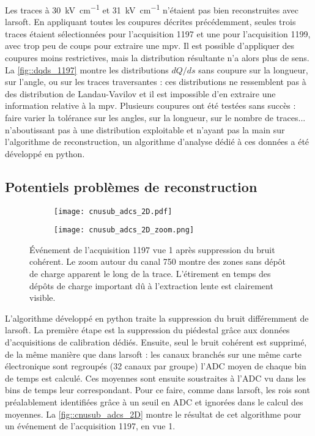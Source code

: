     Les traces à \SI{30}{\kilo\volt\per\centi\meter} et \SI{31}{\kilo\volt\per\centi\meter} n'étaient pas bien reconstruites avec \gls{larsoft}. En appliquant toutes les coupures décrites précédemment, seules trois traces étaient sélectionnées pour l'acquisition 1197 et une pour l'acquisition 1199, avec trop peu de coups pour extraire une \gls{mpv}. Il est possible d'appliquer des coupures moins restrictives, mais la distribution résultante n'a alors plus de sens. La \autoref{fig::dqds_1197} montre les distributions $dQ/ds$ sans coupure sur la longueur, sur l'angle, ou sur les traces traversantes : ces distributions ne ressemblent pas à des distribution de Landau-Vavilov et il est impossible d'en extraire une information relative à la \gls{mpv}. Plusieurs coupures ont été testées sans succès : faire varier la tolérance sur les angles, sur la longueur, sur le nombre de traces... n'aboutissant pas à une distribution exploitable et n'ayant pas la main sur l'algorithme de reconstruction, un algorithme d'analyse dédié à ces données a été développé en python.

    \subsection{Potentiels problèmes de reconstruction}

      \begin{figure}[htbp]
        \centering
        \begin{subfigure}[t]{0.8\textwidth}
          \centering
          \texttt{[image: cnusub\_adcs\_2D.pdf]}
        \end{subfigure}\hfill
        \begin{subfigure}[t]{0.19\textwidth}
          \centering
          \texttt{[image: cnusub\_adcs\_2D\_zoom.png]}
        \end{subfigure}
        \caption[Événement de l'acquisition 1197 vue 1 après suppression du bruit cohérent]{\label{fig::cnusub_adcs_2D}Événement de l'acquisition 1197 vue 1 après suppression du bruit cohérent. Le zoom autour du canal 750 montre des zones sans dépôt de charge apparent le long de la trace. L'étirement en temps des dépôts de charge important dû à l'extraction lente est clairement visible.}
      \end{figure}

      L'algorithme développé en python traite la suppression du bruit différemment de \gls{larsoft}. La première étape est la suppression du piédestal grâce aux données d'acquisitions de calibration dédiés. Ensuite, seul le bruit cohérent est supprimé, de la même manière que dans \gls{larsoft} : les canaux branchés sur une même carte électronique sont regroupés (32 canaux par groupe) l'ADC moyen de chaque bin de temps est calculé. Ces moyennes sont ensuite soustraites à l'ADC vu dans les bins de temps leur correspondant. Pour ce faire, comme dans \gls{larsoft}, les \glspl{roi} sont préalablement identifiées grâce à un seuil en ADC et ignorées dans le calcul des moyennes. La \autoref{fig::cnusub_adcs_2D} montre le résultat de cet algorithme pour un événement de l'acquisition 1197, en vue 1.

